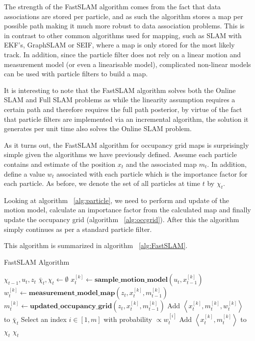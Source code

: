 \documentclass[english]{article}
\begin{document}
The strength of the FastSLAM algorithm comes from the fact that data associations are stored per particle, and as such the algorithm stores a map per possible path making it much more robust to data association problems. This is in contrast to other common algorithms used for mapping, such as SLAM with EKF's, GraphSLAM or SEIF, where a map is only stored for the most likely track. In addition, since the particle filter does not rely on a linear motion and measurement model (or even a linearisable model), complicated non-linear models can be used with particle filters to build a map.

It is interesting to note that the FastSLAM algorithm solves both the Online SLAM and Full SLAM problems as while the linearity assumption requires a certain path and therefore requires the full path posterior, by virtue of the fact that particle filters are implemented via an incremental algorithm, the solution it generates per unit time also solves the Online SLAM problem.

As it turns out, the FastSLAM algorithm for occupancy grid maps is surprisingly simple given the algorithms we have previously defined. Assume each particle contains and estimate of the position $x_t$ and the associated map $m_t$. In addition, define a value $w_t$ associated with each particle which is the importance factor for each particle. As before, we denote the set of all particles at time $t$ by $\chi_{t}$.

Looking at algorithm ~\ref{alg:particle}, we need to perform and update of the motion model, calculate an importance factor from the calculated map and finally update the occupancy grid (algorithm ~\ref{alg:occgrid}). After this the algorithm simply continues as per a standard particle filter.

This algorithm is summarized in algorithm ~\ref{alg:FastSLAM}.

\begin{algorithm}
\caption{FastSLAM Algorithm}
\label{alg:FastSLAM}
\begin{algorithmic}
	\REQUIRE $\chi_{t-1}, u_t, z_t$
	\STATE $\bar{\chi}_t, \chi_t \leftarrow \emptyset$
	\STATE $x_t^{[k]} \leftarrow \textbf{sample\_motion\_model}(u_t, x_{t-1}^{[k]})$
	\STATE $w_t^{[k]} \leftarrow \textbf{measurement\_model\_map}(z_t, x_t^{[k]}, m_{t-1}^{[k]})$
	\STATE $m_t^{[k]} \leftarrow \textbf{updated\_occupancy\_grid}(z_t, x_t^{[k]}, m_{t-1}^{[k]})$
	\STATE Add $\left\langle x_t^{[k]}, m_t^{[k]}, w_t^{[k]} \right\rangle$ to $\bar{\chi}_t$
	\ENDFOR
	\STATE Select an index $i \in [1,m]$ with probability $\propto w_t^{[i]}$
	\STATE Add $\left\langle x_t^{[k]}, m_t^{[k]} \right\rangle$ to $\chi_t$
	\ENDFOR
	\RETURN $\chi_t$


\end{algorithmic}
\end{algorithm}
\end{document}
